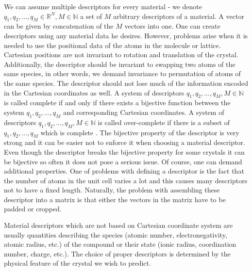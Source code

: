 \documentclass[11pt,oneside,czech,american]{book} %
\theoremstyle{definition} %
\theoremstyle{definition}
\begin{document}
We can assume multiple descriptors for every material - we denote $q_1, q_2, \dots, q_M \in \mathbb{R}^N, M \in \mathbb{N}$ a set of $M$ arbitrary descriptors of a material. A vector can be given by concatenation of the $M$ vectors into one.  %
One can create descriptors using any material data he desires. However, problems arise when it is needed to use the positional data of the atoms in the molecule or lattice. Cartesian positions are not invariant to rotation and translation of the crystal. Additionally, the descriptor should be invariant to swapping two atoms of the same species, in other words, we demand invariance to permutation of atoms of the same species. 
The descriptor should not lose much of the information encoded in the Cartesian coordinates as well. A system of descriptors ${q_1, q_2, \dots, q_M}, M \in \mathbb{N}$ is called complete if and only if there exists a bijective function between the system ${q_1, q_2, \dots, q_M}$ and corresponding Cartesian coordinates. A system of descriptors ${q_1, q_2, \dots, q_M}, M \in \mathbb{N}$ is called over-complete if there is a subset of ${q_1, q_2, \dots, q_M}$ which is complete \parencite{bartok13}. The bijective property of the descriptor is very strong and it can be easier not to enforce it when choosing a material descriptor. Even though the descriptor breaks the bijective property for some crystals it can be bijective so often it does not pose a serious issue. Of course, one can demand additional properties. One of problems with defining a descriptor is the fact that the number of atoms in the unit cell varies a lot and this causes many descriptors not to have a fixed length. Naturally, the problem with assembling these descriptor into a matrix is that either the vectors in the matrix have to be padded or cropped.

Material descriptors which are not based on Cartesian coordinate system are usually quantities describing the species (atomic number, electronegativity, atomic radius, etc.) of the compound or their state (ionic radius, coordination number, charge, etc.). The choice of proper descriptors is determined by the physical feature of the crystal we wish to predict. 
\end{document}
